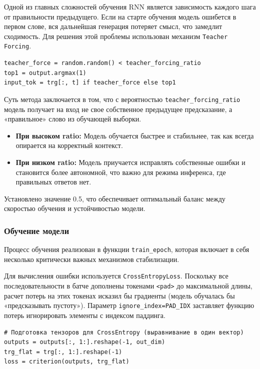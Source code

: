 \documentclass[coursework]{SCWorks}
\begin{document}
    Одной из главных сложностей обучения RNN является зависимость каждого шага от правильности предыдущего.
    Если на старте обучения модель ошибется в первом слове, вся дальнейшая генерация потеряет смысл, что замедлит сходимость.
    Для решения этой проблемы использован механизм \texttt{Teacher Forcing}.

    \begin{verbatim}
teacher_force = random.random() < teacher_forcing_ratio
top1 = output.argmax(1)
input_tok = trg[:, t] if teacher_force else top1
    \end{verbatim}

    Суть метода заключается в том, что с вероятностью \texttt{teacher\_forcing\_ratio} модель получает на
    вход не свое собственное предыдущее предсказание, а «правильное» слово из обучающей выборки.
    \begin{itemize}
        \item \textbf{При высоком ratio:} Модель обучается быстрее и стабильнее, так как всегда опирается на корректный контекст.
        \item \textbf{При низком ratio:} Модель приучается исправлять собственные ошибки и становится более автономной, что важно для режима инференса, где правильных ответов нет.
    \end{itemize}

    Установлено значение 0.5, что обеспечивает оптимальный баланс между скоростью обучения и устойчивостью модели.

    \subsubsection{Обучение модели}

    Процесс обучения реализован в функции \texttt{train\_epoch},
    которая включает в себя несколько критически важных механизмов стабилизации.

    Для вычисления ошибки используется \texttt{CrossEntropyLoss}.
    Поскольку все последовательности в батче дополнены токенами \texttt{<pad>} до максимальной длины,
    расчет потерь на этих токенах исказил бы градиенты (модель обучалась бы «предсказывать пустоту»).
    Параметр \texttt{ignore\_index=PAD\_IDX} заставляет функцию потерь игнорировать элементы с индексом паддинга.

    \begin{verbatim}
# Подготовка тензоров для CrossEntropy (выравнивание в один вектор)
outputs = outputs[:, 1:].reshape(-1, out_dim)
trg_flat = trg[:, 1:].reshape(-1)
loss = criterion(outputs, trg_flat)
    \end{verbatim}
\end{document}
